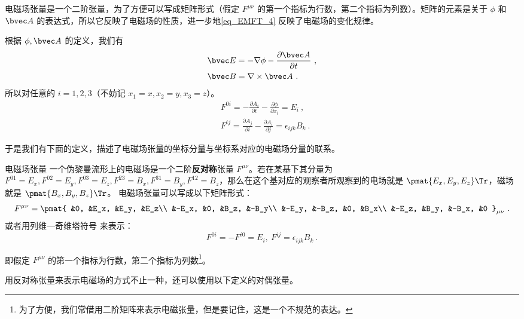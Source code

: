 电磁场张量是一个二阶张量，为了方便可以写成矩阵形式（假定 $F^{\mu\nu}$ 的第一个指标为行数，第二个指标为列数）。矩阵的元素是关于 $\phi$ 和 $\bvec A$ 的表达式，所以它反映了电磁场的性质，进一步地\autoref{eq_EMFT_4} 反映了电磁场的变化规律。

根据 $\phi,\bvec A$ 的定义，我们有
\begin{equation}
\begin{aligned}
&\bvec E=-\nabla \phi-\frac{ \partial \bvec A}{\partial t}~,
\\
&\bvec B=\nabla\times \bvec A~.
\end{aligned}
\end{equation}
所以对任意的 $i=1,2,3$（不妨记 $x_1=x,x_2=y,x_3=z$）。
\begin{equation}
\begin{aligned}
&F^{0i}=-\frac{\partial A_i}{\partial t}-\frac{\partial \phi}{\partial x_i}=E_i~,\\
&F^{ij}=\frac{\partial A_j}{\partial i}-\frac{\partial A_i}{\partial j}=\epsilon_{ijk}B_k~.
\end{aligned}
\end{equation}

于是我们有下面的定义，描述了电磁场张量的坐标分量与坐标系对应的电磁场分量的联系。

\begin{definition}{电磁场张量}
一个伪黎曼流形上的电磁场是一个二阶\textbf{反对称}张量 $F^{\mu\nu}$。若在某基下其分量为 $F^{01}=E_x, F^{02}=E_y, F^{03}=E_z, F^{23}=B_x, F^{31}=B_y, F^{12}=B_z$，那么在这个基对应的观察者所观察到的电场就是 $\pmat{E_x, E_y, E_z}\Tr$，磁场就是 $\pmat{B_x, B_y, B_z}\Tr$。
电磁场张量可以写成以下矩阵形式：
\begin{equation}\label{eq_EMFT_1}
F^{\mu\nu}=\pmat{
&0, &E_x, &E_y, &E_z\\
&-E_x, &0, &B_z, &-B_y\\
&-E_y, &-B_z, &0, &B_x\\
&-E_z, &B_y, &-B_x, &0
}_{\mu\nu}~.
\end{equation}
或者用列维—奇维塔符号 来表示：
\begin{equation}
F^{0 i}=-F^{i 0}=E_i,\ F^{ij}=\epsilon_{ijk}B_k~.
\end{equation}
\end{definition}
即假定 $F^{\mu\nu}$ 的第一个指标为行数，第二个指标为列数\footnote{为了方便，我们常借用二阶矩阵来表示电磁张量，但是要记住，这是一个不规范的表达。}。

用反对称张量来表示电磁场的方式不止一种，还可以使用以下定义的对偶张量。

